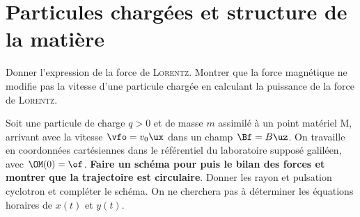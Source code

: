 \documentclass[a4paper, 10pt, final, garamond]{book}
\begin{document}
\setcounter{chapter}{17}


\chapter{Particules chargées et structure de la matière}

\begin{enumerate}[label=\sqenumi]
	Donner l'expression de la force de \textsc{Lorentz}. Montrer que la force
	magnétique ne modifie pas la vitesse d'une particule chargée en calculant la
	puissance de la force de \textsc{Lorentz}.
	\smallbreak
	\vspace{-15pt}
	\psw{
		\[
			\Ff \stm{=} q \left( \Ef + \vf \wedge \Bf \right)
			\Ra
			\Pc(\Ff) = q \left( \Ef + \vf \wedge \Bf \right)\cdot \vf
			= q\Ef\cdot\vf +
			q\underbracket[1pt]{\underbracket[1pt]{\vf\wedge\Bf}_{\perp\vf}\cdot\vf}_{=0}
			\Lra
			\boxed{\Pc(\Ff) \stm[-1]{=} q\Ef\cdot\vf} \stm{=} \dv{\Ec_c}{t}
		\]
	}
	\vspace{-15pt}
	\noindent
	\begin{minipage}[t]{.70\linewidth}
		Soit une particule de charge $q > 0$ et de masse $m$ assimilé à un point
		matériel M, arrivant avec la vitesse $\vfo = v_0\ux$ dans un champ $\Bf =
			B\uz$. On travaille en coordonnées cartésiennes dans le référentiel du
		laboratoire supposé galiléen, avec $\OM(0) = \of$. \textbf{Faire un schéma
			pour puis le bilan des forces et montrer que la trajectoire est circulaire}.
		Donner les rayon et pulsation cyclotron et compléter le schéma. On ne
		cherchera pas à déterminer les équations horaires de $x(t)$ et $y(t)$.
	\end{minipage}
	\hfill
	\begin{minipage}[t]{.28\linewidth}
		\vspace{-20pt}
		\begin{center}
\end{center}
\end{minipage}
\end{enumerate}
\end{document}
